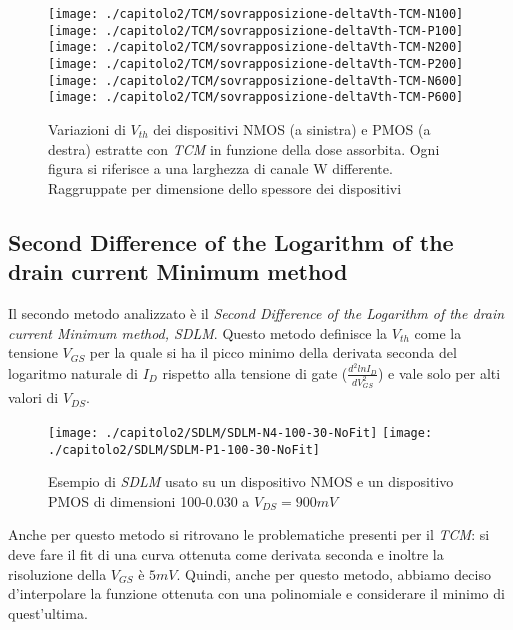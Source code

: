 \begin{figure}[H]
  \centering
  \texttt{[image: ./capitolo2/TCM/sovrapposizione-deltaVth-TCM-N100]}
  \texttt{[image: ./capitolo2/TCM/sovrapposizione-deltaVth-TCM-P100]}
  \texttt{[image: ./capitolo2/TCM/sovrapposizione-deltaVth-TCM-N200]}
  \texttt{[image: ./capitolo2/TCM/sovrapposizione-deltaVth-TCM-P200]}
  \texttt{[image: ./capitolo2/TCM/sovrapposizione-deltaVth-TCM-N600]}
  \texttt{[image: ./capitolo2/TCM/sovrapposizione-deltaVth-TCM-P600]}

  \caption{Variazioni di $V_{th}$ dei dispositivi NMOS (a sinistra) e PMOS (a destra) estratte con \emph{TCM} in funzione della dose assorbita. Ogni figura si riferisce a una larghezza di canale W differente. Raggruppate per dimensione dello spessore dei dispositivi}
  \label{fig:deltaVthTCM}
\end{figure}

\subsection[SDLM]{Second Difference of the Logarithm of the drain current Minimum method}
Il secondo metodo analizzato è il \emph{Second Difference of the Logarithm of the drain current Minimum method, SDLM}. Questo metodo definisce la $V_{th}$ come la tensione $V_{GS}$ per la quale si ha il picco minimo della derivata seconda del logaritmo naturale di $I_D$ rispetto alla tensione di gate ($\frac{d^2lnI_D}{dV_{GS}^2}$) e vale solo per alti valori di $V_{DS}$\cite{art1}.


\begin{figure}[H]
  \centering
  \texttt{[image: ./capitolo2/SDLM/SDLM-N4-100-30-NoFit]}
  \texttt{[image: ./capitolo2/SDLM/SDLM-P1-100-30-NoFit]}
  \caption{Esempio di \emph{SDLM} usato su un dispositivo NMOS e un dispositivo PMOS di dimensioni 100-0.030 a $V_{DS} = 900 mV$}
\end{figure}

Anche per questo metodo si ritrovano le problematiche presenti per il \emph{TCM}: si deve fare il fit di una curva ottenuta come derivata seconda e inoltre la risoluzione della $V_{GS}$ è $5mV$.
Quindi, anche per questo metodo, abbiamo deciso d'interpolare la funzione ottenuta con una polinomiale e considerare il minimo di quest'ultima.

